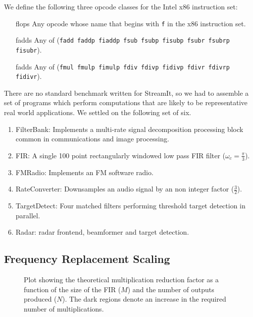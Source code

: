 We define the following three opcode classes for the Intel x86 instruction set:
\begin{itemize}
\item[flops] Any opcode whose name that begins with {\tt f} in the x86 instruction set.
\vspace{-6pt}
\item[fadds] Any of ({\tt fadd faddp fiaddp fsub fsubp fisubp fsubr fsubrp fisubr}).
\vspace{-6pt}
\item[fadds] Any of ({\tt fmul fmulp fimulp fdiv fdivp fidivp fdivr fdivrp fidivr}).
\vspace{-6pt}
\end{itemize}

There are no standard benchmark written for StreamIt, so we had to assemble
a set of programs which perform computations that are likely to be representative
real world applications. We settled on the following set of six.

\begin{enumerate}
\item FilterBank: Implements a multi-rate signal decomposition processing block common in communications and image processing.
\vspace{-6pt}
\item FIR: A single 100 point rectangularly windowed low pass FIR filter ($\omega_c=\frac{\pi}{3}$).
\vspace{-6pt}
\item FMRadio: Implements an FM software radio.
\vspace{-6pt}
\item RateConverter: Downsamples an audio signal by an non integer factor ($\frac{3}{2}$).
\vspace{-6pt}
\item TargetDetect: Four matched filters performing threshold target detection in parallel.
\vspace{-6pt}
\item Radar: radar frontend, beamformer and target detection.
\vspace{-6pt}
\end{enumerate}


\subsection{Frequency Replacement Scaling}

\begin{figure}
\center
\epsfxsize=3.2in
\caption{Plot showing the theoretical multiplication reduction factor as a function of the size of the FIR ($M$) and the number of outputs produced ($N$). The dark regions denote an increase in the required number of multiplications.}
\label{fig:frequency-win-theory}
\vspace{-12pt}
\end{figure}

